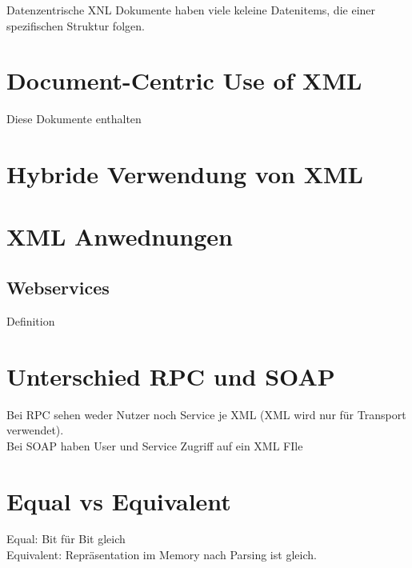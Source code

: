 Datenzentrische XNL Dokumente haben viele keleine Datenitems, die einer spezifischen Struktur folgen.

\section{Document-Centric Use of XML}
Diese Dokumente enthalten

\section{Hybride Verwendung von XML}

\section{XML Anwednungen}
\subsection{Webservices}
Definition

\section{Unterschied RPC und SOAP}
Bei RPC sehen weder Nutzer noch Service je XML (XML wird nur für Transport verwendet).\\
Bei SOAP haben User und Service Zugriff auf ein XML FIle


\section{Equal vs Equivalent}
Equal: Bit für Bit gleich\\
Equivalent: Repräsentation im Memory nach Parsing ist gleich.











